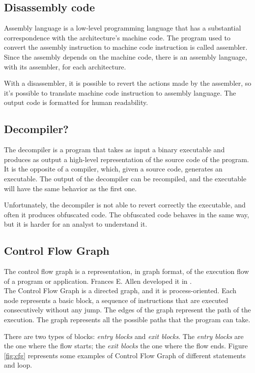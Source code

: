 \subsection{Disassembly code}

Assembly language is a low-level programming language that has a substantial correspondence with the architecture's machine code. The program used to convert the assembly instruction to machine code instruction is called assembler. Since the assembly depends on the machine code, there is an assembly language, with its assembler, for each architecture.

With a disassembler, it is possible to revert the actions made by the assembler, so it's possible to translate machine code instruction to assembly language. The output code is formatted for human readability.

\subsection{Decompiler?}

The decompiler is a program that takes as input a binary executable and produces as output a high-level representation of the source code of the program. It is the opposite of a compiler, which, given a source code, generates an executable. The output of the decompiler can be recompiled, and the executable will have the same behavior as the first one. 

Unfortunately, the decompiler is not able to revert correctly the executable, and often it produces obfuscated code. The obfuscated code behaves in the same way, but it is harder for an analyst to understand it.

\subsection{Control Flow Graph}

The control flow graph is a representation, in graph format, of the execution flow of a program or application. Frances E. Allen developed it in \cite{allen1970control}.
\\

The Control Flow Graph is a directed graph, and it is process-oriented. Each node represents a basic block, a sequence of instructions that are executed consecutively without any jump. The edges of the graph represent the path of the execution. The graph represents all the possible paths that the program can take.

There are two types of blocks:\textit{ entry blocks} and \textit{exit blocks}.
The \textit{entry blocks} are the one where the flow starts; the \textit{exit blocks} the one where the flow ends. Figure \ref{fig:cfg} represents some examples of Control Flow Graph of different statements and loop. 

